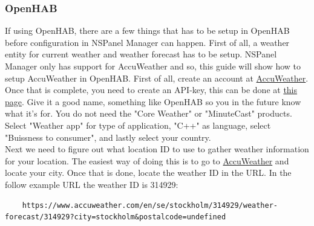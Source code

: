 \documentclass[10pt]{article}
\begin{document}
    \subsubsection{OpenHAB}
    If using OpenHAB, there are a few things that has to be setup in OpenHAB before configuration in NSPanel Manager can happen. First of all, a weather entity for current weather and weather forecast has to be setup. 
    NSPanel Manager only has support for AccuWeather and so, this guide will show how to setup AccuWeather in OpenHAB. First of all, create an account at \href{https://developer.accuweather.com/user/register}{AccuWeather}.
    Once that is complete, you need to create an API-key, this can be done at \href{https://developer.accuweather.com/user/me/apps}{this page}. Give it a good name, something like OpenHAB so you in the future know what it's for.
    You do not need the "Core Weather" or "MinuteCast" products. Select "Weather app" for type of application, "C++" as language, select "Buissness to consumer", and lastly select your country.
    \\
    Next we need to figure out what location ID to use to gather weather information for your location. The easiest way of doing this is to go to \href{https://accuweather.com}{AccuWeather} and locate your city.
    Once that is done, locate the weather ID in the URL. In the follow example URL the weather ID is 314929:
    \begin{lstlisting}
    https://www.accuweather.com/en/se/stockholm/314929/weather-forecast/314929?city=stockholm&postalcode=undefined
    \end{lstlisting}
\end{document}
